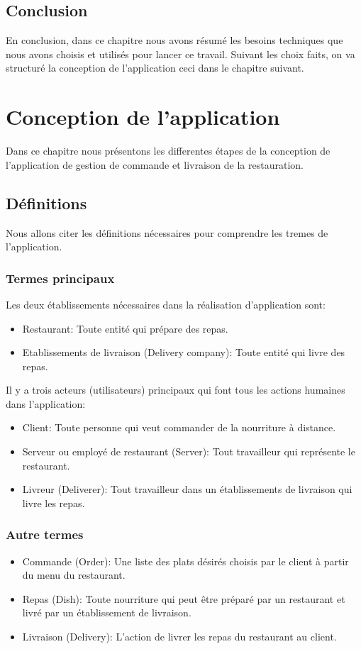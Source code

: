 \documentclass[french, a4paper, 12pt]{report}
\begin{document}
\section*{Conclusion}En conclusion, dans ce chapitre nous avons résumé les besoins techniques que nous avons choisis et utilisés pour lancer ce travail. Suivant les choix faits, on va structuré la conception de l'application ceci dans le chapitre suivant.

\newpage
\chapter{Conception de l'application} Dans ce chapitre nous présentons les differentes étapes de la conception de l'application de gestion de commande et livraison de la restauration.
	\section{Définitions} Nous allons citer les définitions nécessaires pour comprendre les tremes de l'application.
	\subsection{Termes principaux}	
	Les deux établissements nécessaires dans la réalisation d'application sont:
	\begin{itemize}
		\item Restaurant: Toute entité qui prépare des repas.
		\item Etablissements de livraison (Delivery company): Toute entité qui livre des repas.
	\end{itemize}
		
	Il y a trois acteurs (utilisateurs) principaux qui font tous les actions humaines dans l'application:
	\begin{itemize}
		\item Client: Toute personne qui veut commander de la nourriture à distance.
		\item Serveur ou employé de restaurant (Server): Tout travailleur qui représente le restaurant.
		\item Livreur (Deliverer): Tout travailleur dans un établissements de livraison qui livre les repas.
	\end{itemize}
	
	\subsection{Autre termes}
	\begin{itemize}
		\item Commande (Order): Une liste des plats désirés choisis par le client à partir du menu du restaurant.
		\item Repas (Dish): Toute nourriture qui peut être préparé par un restaurant et livré par un établissement de livraison.
		\item Livraison (Delivery): L'action de livrer les repas du restaurant au client.
	\end{itemize}
	
\end{document}
